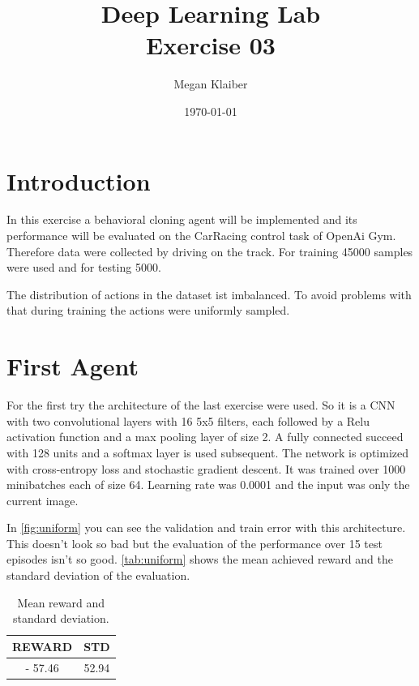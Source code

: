 \documentclass[a4paper,12pt]{article}
\begin{document}
\title{Deep Learning Lab \\ Exercise 03 }
\author{Megan Klaiber}
\date{\today}
\maketitle

\section{Introduction}

In this exercise a behavioral cloning agent will be implemented and its performance will be evaluated on the CarRacing control task of OpenAi Gym. Therefore data were collected by driving on the track. For training 45000 samples were used and for testing 5000.

The distribution of actions in the dataset ist imbalanced. To avoid problems with that during training the actions were uniformly sampled.


\section{First Agent}\label{first}
For the first try the architecture of the last exercise were used. So it is a CNN with two convolutional layers with 16 5x5 filters, each followed by a Relu activation function and a max pooling layer of size 2. A fully connected succeed with 128 units and a softmax layer is used subsequent. The network is optimized with cross-entropy loss and stochastic gradient descent.
It was trained over 1000 minibatches each of size 64. Learning rate was 0.0001 and the input was only the current image.

In \autoref{fig:uniform} you can see the validation and train error with this architecture. This doesn't look so bad but the evaluation of the performance over 15 test episodes isn't so good. \autoref{tab:uniform} shows the mean achieved reward and the standard deviation of the evaluation. \\


\begin{table}[h] 
	\centering
	\begin{tabular}{|c | c|} 
		\hline
		\bfseries{REWARD} & \bfseries{STD} \\ 
		\hline
		- 57.46 & 52.94 \\  
		\hline
	\end{tabular}
	\caption{\label{tab:uniform} Mean reward and standard deviation.}
\end{table}
\end{document}
